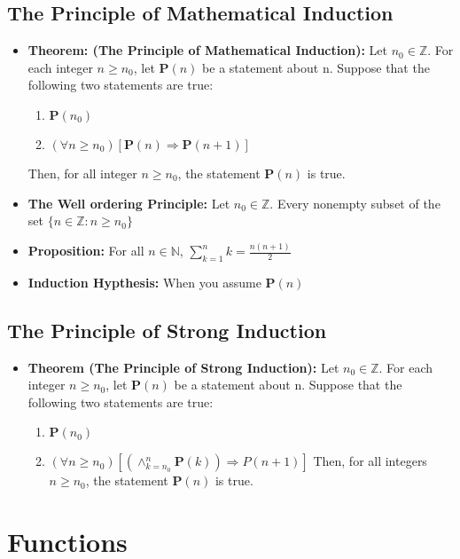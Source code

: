 \documentclass{report}
\begin{document}
	\section{The Principle of Mathematical Induction}
		\begin{itemize}\addtolength{\leftskip}{2em}
			\item \textbf{Theorem: (The Principle of Mathematical Induction):} Let $n_0\in\mathbb{Z}$. For each integer $n\ge n_0$, let $\textbf{P}(n)$ be a statement about n. Suppose that the following two statements are true:
			\begin{enumerate}\addtolength{\leftskip}{4em}
				\item $\textbf{P}(n_0)$
				\item $(\forall n\ge n_0)[\textbf{P}(n)\Rightarrow \textbf{P}(n+1)]$
			\end{enumerate}
			\subsubitem Then, for all integer $n\ge n_0$, the statement $\textbf{P}(n)$ is true.
			\item \textbf{The Well ordering Principle:} Let $n_0\in \mathbb{Z}$. Every nonempty subset of the set $\{n\in \mathbb{Z}:n\ge n_0\}$
			\item \textbf{Proposition:} For all \huge$n\in\mathbb{N}$, $\sum\limits_{k=1}^{n}k=\frac{n(n+1)}{2}$
			\large\item \textbf{Induction Hypthesis:} When you assume $\textbf{P}(n)$
		\end{itemize}
	\section{The Principle of Strong Induction}
		\begin{itemize}\addtolength{\leftskip}{2em}
			\item \textbf{Theorem (The Principle of Strong Induction):} Let $n_0\in \mathbb{Z}$. For each integer $n\ge n_0$, let $\textbf{P}(n)$ be a statement about n. Suppose that the following two statements are true:
			\begin{enumerate}\addtolength{\leftskip}{4em}
				\item $\textbf{P}(n_0)$
				\item $(\forall n\ge n_0)[(\wedge_{k=n_0}^{n}\textbf{P}(k))\Rightarrow P(n+1)]$
				\subitem Then, for all integers $n\ge n_0$, the statement $\textbf{P}(n)$ is true.
			\end{enumerate} 
		\end{itemize}
		
\chapter{Functions}
\end{document}
